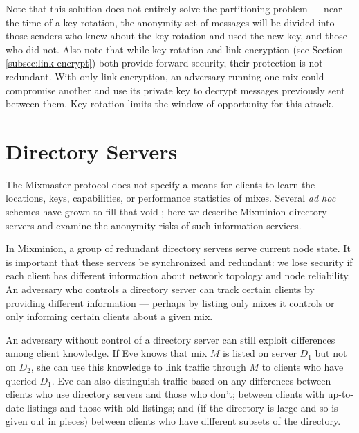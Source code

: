 \documentclass[11pt]{IEEEtran}
\begin{document}
Note that this solution does not entirely solve the partitioning problem
--- near the time of a key rotation, the anonymity set of messages will
be divided into those senders who knew about the key rotation and used
the new key, and those who did not.%
Also note that while key rotation and link encryption (see Section
\ref{subsec:link-encrypt}) both provide forward security, their protection
is not redundant. With only link encryption, an adversary running
one mix could compromise another and use its private key to decrypt
messages previously sent between them. Key rotation limits the window
of opportunity for this attack.



\section{Directory Servers}
\label{sec:dir-servers}

The Mixmaster protocol does not specify a means for clients to learn the
locations, keys, capabilities, or performance statistics of mixes. Several
\emph{ad hoc} schemes have grown to fill that void \cite{levien}; here
we describe Mixminion directory servers and examine the anonymity risks
of such information services.

In Mixminion, a group of redundant directory servers serve current
node state.  It is important that these servers be synchronized and
redundant:  we lose security if each client has different information
about network topology and node reliability. An adversary who controls
a directory server can track certain clients by providing different
information --- perhaps by listing only mixes it controls or only
informing certain clients about a given mix.

An adversary without control of a directory server can still exploit
differences among client knowledge. If Eve knows that mix $M$ is listed
on server $D_1$ but not on $D_2$, she can use this knowledge to link
traffic through $M$ to clients who have queried $D_1$.  Eve can also
distinguish traffic based on any differences between clients who use
directory servers and those who don't; between clients with up-to-date
listings and those with old listings; and (if the directory is large
and so is given out in pieces) between clients who have different subsets
of the directory.
\end{document}
